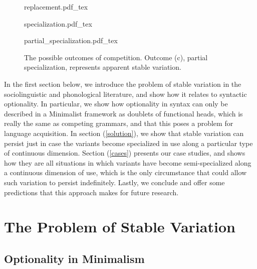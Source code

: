 \begin{figure}[h!tbp]
 \centering
 \begin{minipage}[b]{0.3\linewidth}
 	\centering
 	\def\svgscale{0.6}
	{replacement.pdf_tex}
	\label{replacement_first}
 \end{minipage}
 \begin{minipage}[b]{0.3\linewidth}
 	\centering
	\def\svgscale{0.6}
	{specialization.pdf_tex}
	\label{specialization_first}
 \end{minipage}
 \begin{minipage}[b]{0.3\linewidth}
 	\centering
	\def\svgscale{0.6}
	{partial_specialization.pdf_tex}
	\label{partial_specialization_first}
 \end{minipage} 
 \caption{The possible outcomes of competition. Outcome (c), partial specialization, represents apparent stable variation.}
 \label{competition_figure_first}
\end{figure}


  
In the first section below, we introduce the problem of stable variation in the sociolinguistic and phonological literature, and show how it relates to syntactic optionality.
In particular, we show how optionality in syntax can only be described in a Minimalist framework as doublets of functional heads, which is really the same as competing grammars, and that this poses a problem for language acquisition.
In section (\ref{solution}), we show that stable variation can persist just in case the variants become specialized in use along a particular type of continuous dimension.
Section (\ref{cases}) presents our case studies, and shows how they are all situations in which variants have become semi-specialized along a continuous dimension of use, which is the only circumstance that could allow such variation to persist indefinitely.
Lastly, we conclude and offer some predictions that this approach makes for future research.


\section{The Problem of Stable Variation}
\subsection{Optionality in Minimalism}

